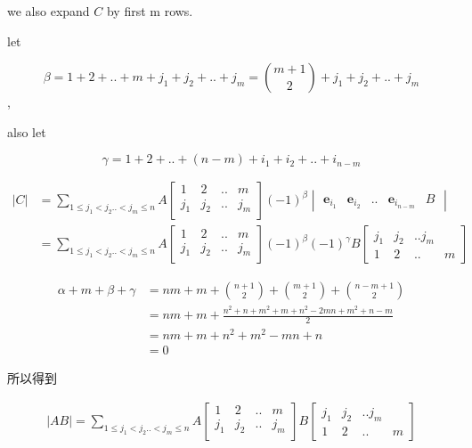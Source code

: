 \documentclass[12pt,a4paper]{ctexart}
\begin{document}
we also expand $C$ by first m rows.

let 

\[
\beta=1+2+.. +m + j_1+j_2 + .. +j_m = \binom{m+1}{2} + j_1 + j_2 + .. + j_m
\],

also let

\[
\gamma = 1+2+.. + (n-m) + i_1 + i_2 + .. + i_{n-m}
\]

\begin{align*}
    |C| &= \sum_{1 \le j_1 < j_2 .. < j_m \le n}A \begin{bmatrix}
        1 & 2 & .. & m \\
        j_1 & j_2 & .. & j_m \\
    \end{bmatrix}(-1)^{\beta} \begin{vmatrix}
       \mathbf{e}_{i_1} & \mathbf{e}_{i_2} & .. & \mathbf{e}_{i_{n-m}} & B
    \end{vmatrix} \\
    &= \sum_{1 \le j_1 < j_2 .. < j_m \le n}A \begin{bmatrix}
        1 & 2 & .. & m \\
        j_1 & j_2 & .. & j_m \\
    \end{bmatrix}(-1)^{\beta}(-1)^{\gamma}B \begin{bmatrix}
       j_1 & j_2 & .. j_m \\ 
       1 & 2 & .. & m
    \end{bmatrix}
\end{align*}

\begin{align*}
\alpha + m + \beta + \gamma &= nm + m + \binom{n+1}{2} + \binom{m+1}{2} + \binom{n-m+1}{2} \\
&= nm + m + \frac{n^2 + n + m^2 + m + n^2 -2mn + m^2 + n-m }{2} \\
&= nm + m + n^2  + m^2 -mn + n \\
&= 0
\end{align*}

所以得到

\begin{align*}
    |AB| = \sum_{1 \le j_1 < j_2 .. < j_m \le n}A \begin{bmatrix}
        1 & 2 & .. & m \\
        j_1 & j_2 & .. & j_m \\
    \end{bmatrix}B \begin{bmatrix}
       j_1 & j_2 & .. j_m \\ 
       1 & 2 & .. & m
    \end{bmatrix}
\end{align*}
\end{document}
